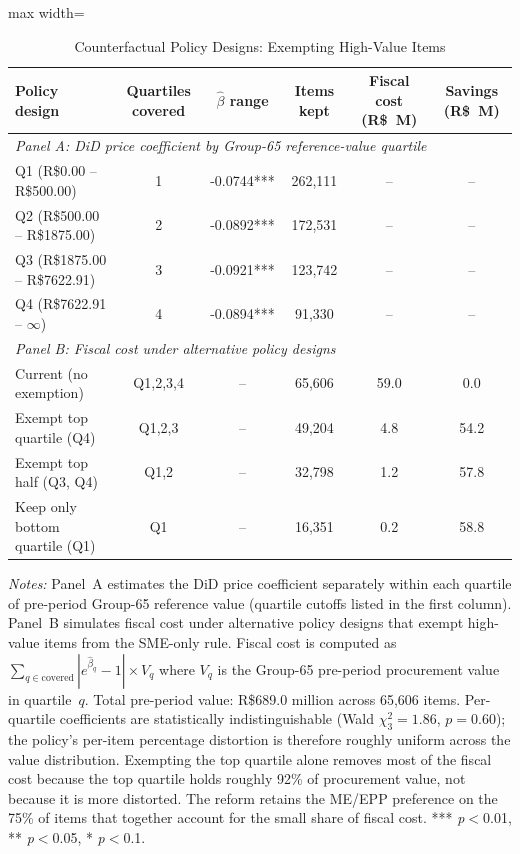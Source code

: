 \begin{table}[htbp]
\centering
\caption{Counterfactual Policy Designs: Exempting High-Value Items}
\label{tab:counterfactual}
\begin{adjustbox}{max width=\textwidth}
\begin{threeparttable}
\small
\begin{tabular}{lccccc}
\toprule
Policy design & Quartiles covered & $\hat\beta$ range & Items kept & Fiscal cost (R\$~M) & Savings (R\$~M) \\
\midrule
\multicolumn{6}{l}{\textit{Panel A: DiD price coefficient by Group-65 reference-value quartile}} \\
Q1 (R\$0.00 -- R\$500.00) & 1 & -0.0744*** & 262,111 & -- & -- \\
Q2 (R\$500.00 -- R\$1875.00) & 2 & -0.0892*** & 172,531 & -- & -- \\
Q3 (R\$1875.00 -- R\$7622.91) & 3 & -0.0921*** & 123,742 & -- & -- \\
Q4 (R\$7622.91 -- $\infty$) & 4 & -0.0894*** & 91,330 & -- & -- \\
\midrule
\multicolumn{6}{l}{\textit{Panel B: Fiscal cost under alternative policy designs}} \\
Current (no exemption) & Q1,2,3,4 & -- & 65,606 & 59.0 & 0.0 \\
Exempt top quartile (Q4) & Q1,2,3 & -- & 49,204 & 4.8 & 54.2 \\
Exempt top half (Q3, Q4) & Q1,2 & -- & 32,798 & 1.2 & 57.8 \\
Keep only bottom quartile (Q1) & Q1 & -- & 16,351 & 0.2 & 58.8 \\
\bottomrule
\end{tabular}
\begin{tablenotes}
\small
\item \textit{Notes:} Panel~A estimates the DiD price coefficient separately
within each quartile of pre-period Group-65 reference value (quartile
cutoffs listed in the first column). Panel~B simulates fiscal cost under
alternative policy designs that exempt high-value items from the SME-only
rule. Fiscal cost is computed as
$\sum_{q \in \text{covered}} |e^{\hat\beta_q} - 1| \times V_q$
where $V_q$ is the Group-65 pre-period procurement value in quartile~$q$.
Total pre-period value: R\$689.0 million across 65,606 items.
Per-quartile coefficients are statistically indistinguishable (Wald
$\chi^2_3 = 1.86$, $p = 0.60$); the policy's per-item percentage distortion
is therefore roughly uniform across the value distribution. Exempting the
top quartile alone removes most of the fiscal cost because the top
quartile holds roughly 92\% of procurement value, not because it is more
distorted. The reform retains the ME/EPP preference on the 75\% of items
that together account for the small share of fiscal cost.
*** \textit{p}$<$0.01, ** \textit{p}$<$0.05, * \textit{p}$<$0.1.
\end{tablenotes}
\end{threeparttable}
\end{adjustbox}
\end{table}
